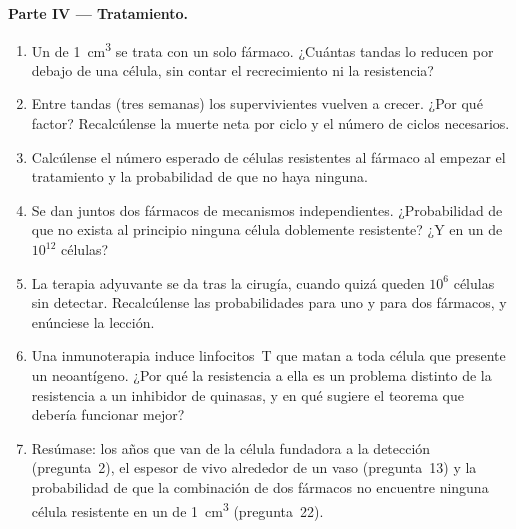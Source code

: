 \begin{problem}
\medskip
\noindent\textbf{Parte IV --- Tratamiento.}
\begin{enumerate}[resume]
  \item Un  de \qty{1}{cm^3} se trata con un solo fármaco. ¿Cuántas
        tandas lo reducen por debajo de una célula, sin contar el
        recrecimiento ni la resistencia?
  \item Entre tandas (tres semanas) los supervivientes vuelven a crecer.
        ¿Por qué factor? Recalcúlense la muerte neta por ciclo y el
        número de ciclos necesarios.
  \item Calcúlense el número esperado de células resistentes al fármaco
        al empezar el tratamiento y la probabilidad de que no haya
        ninguna.
  \item Se dan juntos dos fármacos de mecanismos independientes.
        ¿Probabilidad de que no exista al principio ninguna célula
        doblemente resistente? ¿Y en un  de $10^{12}$ células?
  \item La terapia adyuvante se da tras la cirugía, cuando quizá queden
        $10^{6}$ células sin detectar. Recalcúlense las probabilidades
        para uno y para dos fármacos, y enúnciese la lección.
  \item Una inmunoterapia induce linfocitos~T que matan a toda célula que
        presente un neoantígeno. ¿Por qué la resistencia a ella es un
        problema distinto de la resistencia a un inhibidor de quinasas, y
        en qué  sugiere el teorema que debería funcionar mejor?
  \item Resúmase: los años que van de la célula fundadora a la detección
        (pregunta~2), el espesor de  vivo alrededor de un vaso
        (pregunta~13) y la probabilidad de que la combinación de dos
        fármacos no encuentre ninguna célula resistente en un  de
        \qty{1}{cm^3} (pregunta~22).
\end{enumerate}
\end{problem}
